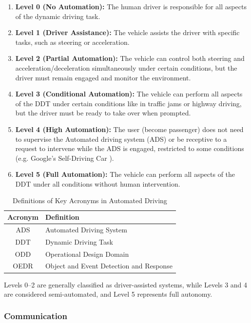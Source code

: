\begin{enumerate}
    \item \textbf{Level 0 (No Automation):} The human driver is responsible for all aspects of the dynamic driving task.
    \item \textbf{Level 1 (Driver Assistance):} The vehicle assists the driver with specific tasks, such as steering or acceleration.
    \item \textbf{Level 2 (Partial Automation):} The vehicle can control both steering and acceleration/deceleration simultaneously under certain conditions, but the driver must remain engaged and monitor the environment.
    \item \textbf{Level 3 (Conditional Automation):} The vehicle can perform all aspects of the DDT under certain conditions like in traffic jams or highway driving, but the driver must be ready to take over when prompted.
    \item \textbf{Level 4 (High Automation):} The user (become passenger) does not need to supervise the Automated driving system (ADS) or be receptive to a request to intervene while the
    ADS is engaged, restricted to some conditions (e.g. Google's Self-Driving Car \cite{teoh2017rage}).
    \item \textbf{Level 5 (Full Automation):} The vehicle can perform all aspects of the DDT under all conditions without human intervention.
\end{enumerate}

\begin{table}[ht]
    \centering
    \begin{tabular}{|c|l|}
        \hline
        \textbf{Acronym} & \textbf{Definition} \\ \hline
        ADS & Automated Driving System \\ \hline
        DDT & Dynamic Driving Task \\ \hline
        ODD & Operational Design Domain \\ \hline
        OEDR & Object and Event Detection and Response \\ \hline
    \end{tabular}
    \caption{Definitions of Key Acronyms in Automated Driving}
    \label{tab:acronyms}
\end{table}

Levels 0–2 are generally classified as driver-assisted systems, while Levels 3 and 4 are considered semi-automated, and Level 5 represents full autonomy.

\subsubsection{Communication}\label{subsubsec:communication}

